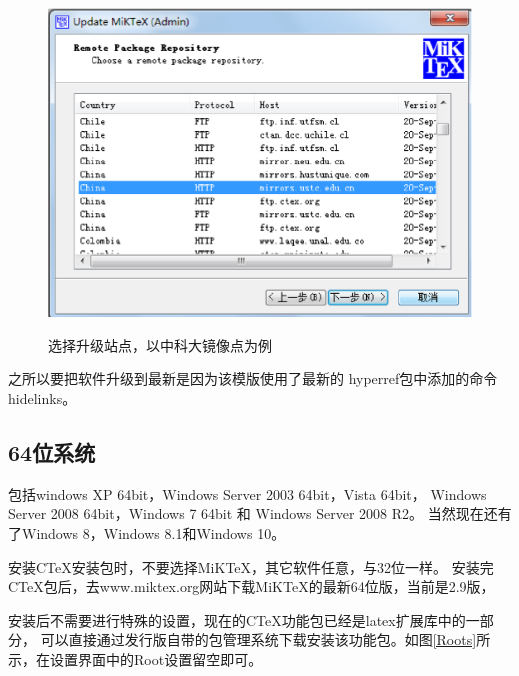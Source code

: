 \begin{figure}[th]
\centering
\includegraphics[scale=0.5]{./Pictures/set3.eps}\\
\caption{选择升级站点，以中科大镜像点为例}
\label{set3}
\end{figure}

之所以要把软件升级到最新是因为该模版使用了最新的
hyperref包中添加的命令\\
hidelinks。

\subsection{64位系统}

包括windows XP 64bit，Windows Server 2003 64bit，Vista 64bit，
Windows Server 2008 64bit，Windows 7 64bit 和 Windows Server 2008 R2。
当然现在还有了Windows 8，Windows 8.1和Windows 10。

安装CTeX安装包时，不要选择MiKTeX，其它软件任意，与32位一样。
安装完CTeX包后，去www.miktex.org网站下载MiKTeX的最新64位版，当前是2.9版，

安装后不需要进行特殊的设置，现在的CTeX功能包已经是latex扩展库中的一部分，
可以直接通过发行版自带的包管理系统下载安装该功能包。如图\ref{Roots}所示，在设置界面中的Root设置留空即可。

